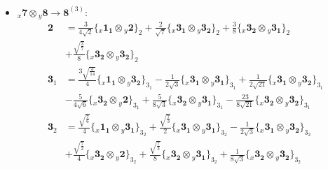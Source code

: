 \documentclass[english]{article}
\newcommand{\rep}[1]{\mathbf{#1}}
\newcommand{\repx}[2]{{}_{#2}\mathbf{#1}}
\newcommand{\tsprodx}[2]{\repx{#1}{x}\otimes\repx{#2}{y}}
\newcommand{\subcgs}[3]{\big\{ \tsprodx{#1}{#2}\big\}^{}_{#3}}
\begin{document}
\begin{itemize}
\begin{align*}
\end{align*}
\item $\tsprodx{7}{8}\to\rep{8}^{(3)}$:
\begin{align*}
\rep{2} & = \frac{3}{4 \sqrt{2}}\subcgs{1_{1}}{2}{2}+\frac{2}{\sqrt{7}}\subcgs{3_{1}}{3_{2}}{2}+\frac{3}{8}\subcgs{3_{2}}{3_{1}}{2} \\ 
 & +\frac{\sqrt{\frac{3}{7}}}{8}\subcgs{3_{2}}{3_{2}}{2}
\\
\rep{3}_{1} & = \frac{3 \sqrt{\frac{3}{14}}}{4}\subcgs{1_{1}}{3_{2}}{3_{1}}-\frac{1}{2 \sqrt{3}}\subcgs{3_{1}}{3_{1}}{3_{1}}+\frac{1}{2 \sqrt{21}}\subcgs{3_{1}}{3_{2}}{3_{1}} \\ 
 & -\frac{5}{4 \sqrt{6}}\subcgs{3_{2}}{2}{3_{1}}+\frac{5}{8 \sqrt{3}}\subcgs{3_{2}}{3_{1}}{3_{1}}-\frac{23}{8 \sqrt{21}}\subcgs{3_{2}}{3_{2}}{3_{1}}
\\
\rep{3}_{2} & = \frac{\sqrt{\frac{7}{6}}}{4}\subcgs{1_{1}}{3_{1}}{3_{2}}+\frac{\sqrt{\frac{7}{3}}}{2}\subcgs{3_{1}}{3_{1}}{3_{2}}-\frac{1}{2 \sqrt{3}}\subcgs{3_{1}}{3_{2}}{3_{2}} \\ 
 & +\frac{\sqrt{\frac{7}{2}}}{4}\subcgs{3_{2}}{2}{3_{2}}+\frac{\sqrt{\frac{7}{3}}}{8}\subcgs{3_{2}}{3_{1}}{3_{2}}+\frac{1}{8 \sqrt{3}}\subcgs{3_{2}}{3_{2}}{3_{2}}
\end{align*}
\end{itemize}
\end{document}

